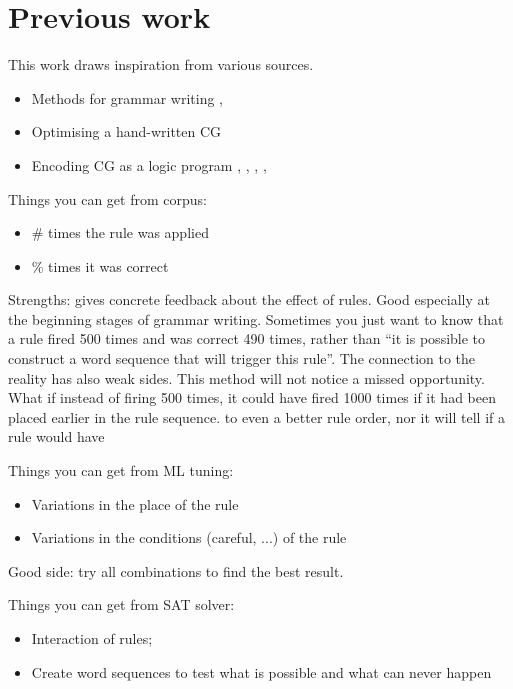 \section{Previous work}

This work draws inspiration from various sources.

\begin{itemize}
\item Methods for grammar writing \cite{voutilainen2004},  \cite{tyers_reynolds2015}
\item Optimising a hand-written CG \cite{bick2013tuning}
\item Encoding CG as a logic program \cite{lager98}, \cite{lindberg_eineborg98ilp},  \cite{lager01transformation}, \cite{asfrent14}, \cite{listenmaa_claessen2015}
\end{itemize}

Things you can get from corpus:

\begin{itemize}
\item \# times the rule was applied
\item \% times it was correct
\end{itemize}
Strengths: gives concrete feedback about the effect of rules. 
Good especially at the beginning stages of grammar writing. 
Sometimes you just want to know that a rule fired 500 times and was correct 490 times, rather than ``it is possible to construct a word sequence that will trigger this rule''.
The connection to the reality has also weak sides. This method will not notice a missed opportunity. What if instead of firing 500 times, it could have fired 1000 times if it had been placed earlier in the rule sequence.
 to even a better rule order, nor it will tell if a rule would have

Things you can get from ML tuning:
\begin{itemize}
\item Variations in the place of the rule
\item Variations in the conditions (careful, ...) of the rule
\end{itemize}
Good side: try all combinations to find the best result.



Things you can get from SAT solver:
\begin{itemize}
\item Interaction of rules; 
\item Create word sequences to test what is possible and what can never happen
\end{itemize}


